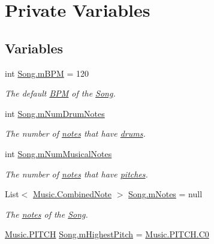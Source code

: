 \hypertarget{group___song_priv_var}{}\section{Private Variables}
\label{group___song_priv_var}
\subsection*{Variables}
\begin{DoxyCompactItemize}
\item 
int \hyperlink{group___song_priv_var_ga3341fbbd9c0c58fe6514623e6b6c5a1e}{Song.\+m\+B\+PM} = 120
\begin{DoxyCompactList}\small\item\em The default \hyperlink{group___audio_DefBPM}{B\+PM} of the \hyperlink{class_song}{Song}. \end{DoxyCompactList}\item 
int \hyperlink{group___song_priv_var_ga3dbce17d96b434d4492280c39cff1778}{Song.\+m\+Num\+Drum\+Notes}
\begin{DoxyCompactList}\small\item\em The number of \hyperlink{group___music_structs_struct_music_1_1_combined_note}{notes} that have \hyperlink{group___music_structs_struct_music_1_1_percussion_note}{drums}. \end{DoxyCompactList}\item 
int \hyperlink{group___song_priv_var_gaf55b4fd2df0457ba1306a75ac3fdc8b1}{Song.\+m\+Num\+Musical\+Notes}
\begin{DoxyCompactList}\small\item\em The number of \hyperlink{group___music_structs_struct_music_1_1_combined_note}{notes} that have \hyperlink{group___music_structs_struct_music_1_1_melody_note}{pitches}. \end{DoxyCompactList}\item 
List$<$ \hyperlink{group___music_structs_struct_music_1_1_combined_note}{Music.\+Combined\+Note} $>$ \hyperlink{group___song_priv_var_ga674bc904a1f856d485d5fb7fe84bac85}{Song.\+m\+Notes} = null
\begin{DoxyCompactList}\small\item\em The \hyperlink{group___music_structs_struct_music_1_1_combined_note}{notes} of the \hyperlink{class_song}{Song}. \end{DoxyCompactList}\item 
\hyperlink{group___music_enums_ga508f69b199ea518f935486c990edac1d}{Music.\+P\+I\+T\+CH} \hyperlink{group___song_priv_var_ga2dcd39d9add609e9df56a94057441dcc}{Song.\+m\+Highest\+Pitch} = \hyperlink{group___music_enums_gga508f69b199ea518f935486c990edac1da9c5959e6f08f10d0edbadf5be1f33c53}{Music.\+P\+I\+T\+C\+H.\+C0}

\end{DoxyCompactItemize}
